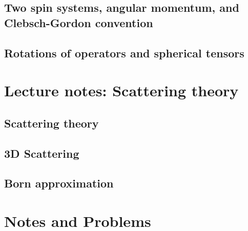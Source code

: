    \chapter{Two spin systems, angular momentum, and Clebsch-Gordon convention}
      
      
      
   \chapter{Rotations of operators and spherical tensors}
      
      

\part{Lecture notes: Scattering theory}
   \chapter{Scattering theory}
      
      
   \chapter{3D Scattering}
      
      
   \chapter{Born approximation}
      

\part{Notes and Problems}
   
   
   
   
   
   
   
   
   
   
   
   
   
